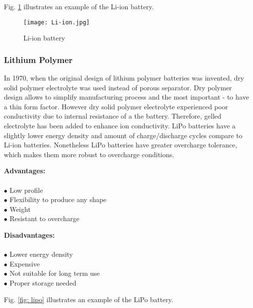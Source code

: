 Fig. \ref{fig: lion} illustrates an example of the Li-ion battery. 

\begin{figure}[h]
	\centering
	\texttt{[image: Li-ion.jpg]}
	\caption{ Li-ion battery \cite{11}}
	\label{fig: lion}
\end{figure}

\subsubsection{Lithium Polymer \label{sec:tech}}

In 1970, when the original design of lithium polymer batteries was invented, dry solid polymer electrolyte was used instead of  porous separator. Dry polymer design allows to simplify manufacturing process and the most important - to have a thin form factor. However dry solid polymer electrolyte experienced poor conductivity due to internal resistance of a the battery. Therefore, gelled electrolyte has been added to enhance ion conductivity. LiPo batteries have a slightly lower energy density and amount of charge/discharge cycles compare to Li-ion batteries. Nonetheless LiPo batteries have greater overcharge tolerance, which makes them more robust to overcharge conditions.


\begin{multicols}{2}
	
	\textbf{Advantages:} \\ \\
	$\bullet$ Low profile \\
	$\bullet$ Flexibility to produce any shape\\
	$\bullet$ Weight\\
	$\bullet$ Resistant to overcharge\\
	
	
	
	
	\columnbreak
	
	\textbf{Disadvantages:} \\ \\
	$\bullet$ Lower energy density\\
	$\bullet$ Expensive\\
	$\bullet$ Not suitable for long term use\\
	$\bullet$ Proper storage needed 
	
	
	
\end{multicols}

Fig. \ref{fig: lipo} illustrates an example of the LiPo battery. 

